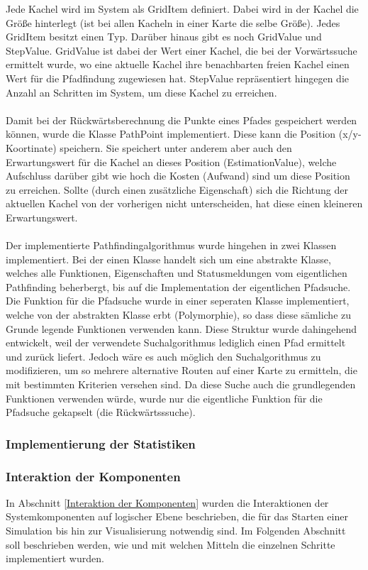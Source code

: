 Jede Kachel wird im System als GridItem definiert. Dabei wird in der Kachel die Größe hinterlegt (ist bei allen Kacheln in einer Karte die selbe Größe). Jedes GridItem besitzt einen Typ. Darüber hinaus gibt es noch GridValue und StepValue. GridValue ist dabei der Wert einer Kachel, die bei der Vorwärtssuche ermittelt wurde, wo eine aktuelle Kachel ihre benachbarten freien Kachel einen Wert für die Pfadfindung zugewiesen hat. StepValue repräsentiert hingegen die Anzahl an Schritten im System, um diese Kachel zu erreichen.
\\\\
Damit bei der Rückwärtsberechnung die Punkte eines Pfades gespeichert werden können, wurde die Klasse PathPoint implementiert. Diese kann die Position (x/y-Koortinate) speichern. Sie speichert unter anderem aber auch den Erwartungswert für die Kachel an dieses Position (EstimationValue), welche Aufschluss darüber gibt wie hoch die Kosten (Aufwand) sind um diese Position zu erreichen. Sollte (durch einen zusätzliche Eigenschaft) sich die Richtung der aktuellen Kachel von der vorherigen nicht unterscheiden, hat diese einen kleineren Erwartungswert.
\\\\
Der implementierte Pathfindingalgorithmus wurde hingehen in zwei Klassen implementiert. Bei der einen Klasse handelt sich um eine abstrakte Klasse, welches alle Funktionen, Eigenschaften und Statusmeldungen vom eigentlichen Pathfinding beherbergt, bis auf die Implementation der eigentlichen Pfadsuche. Die Funktion für die Pfadsuche wurde in einer seperaten Klasse implementiert, welche von der abstrakten Klasse erbt (Polymorphie), so dass diese sämliche zu Grunde legende Funktionen verwenden kann. Diese Struktur wurde dahingehend entwickelt, weil der verwendete Suchalgorithmus lediglich einen Pfad ermittelt und zurück liefert. Jedoch wäre es auch möglich den Suchalgorithmus zu modifizieren, um so mehrere alternative Routen auf einer Karte zu ermitteln, die mit bestimmten Kriterien versehen sind. Da diese Suche auch die grundlegenden Funktionen verwenden würde, wurde nur die eigentliche Funktion für die Pfadsuche gekapselt (die Rückwärtsssuche).

\subsubsection{Implementierung der Statistiken}
\subsubsection{Interaktion der Komponenten}
In Abschnitt \ref{Interaktion der Komponenten} wurden die Interaktionen der Systemkomponenten auf logischer Ebene beschrieben, die für das Starten einer Simulation bis hin zur Visualisierung notwendig sind. Im Folgenden Abschnitt soll beschrieben werden, wie und mit welchen Mitteln die einzelnen Schritte implementiert wurden. 
